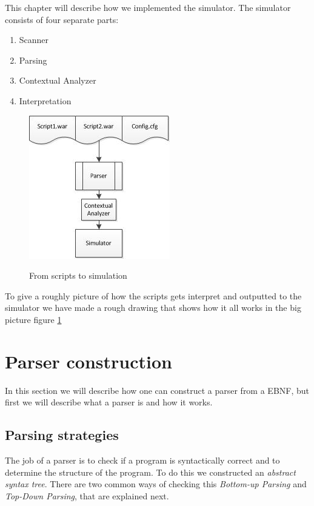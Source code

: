 This chapter will describe how we implemented the simulator. The simulator consists of four separate parts: \\
\begin{enumerate}
	\item Scanner
	\item Parsing
	\item Contextual Analyzer
	\item Interpretation
\end{enumerate}

\begin{figure}[H]
\centering
\includegraphics[scale=1.2]{rapport/6/figures/script_to_simu}
\label{fig:script_to_simu}
\caption{From scripts to simulation}
\end{figure}

To give a roughly picture of how the scripts gets interpret and outputted to the simulator we have made a rough drawing that shows how it all works in the big picture figure \ref{fig:script_to_simu}

\section{Parser construction}
	In this section we will describe how one can construct a parser from a EBNF, but first we will describe what a parser is and how it works.
	
	\subsection{Parsing strategies}
		The job of a parser is to check if a program is syntactically correct and 
		to determine the structure of the program. To do this we constructed an {\it abstract syntax tree}.
		There are two common ways of checking this {\it Bottom-up Parsing} and {\it Top-Down Parsing}, that are explained next.
		
